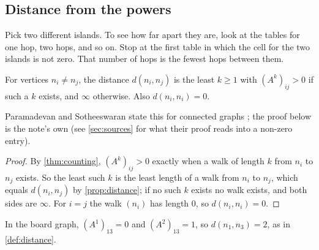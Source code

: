 \subsection{Distance from the powers}

\plainwords{} Pick two different islands. To see how far apart they are, look at
the tables for one hop, two hops, and so on. Stop at the first
table in which the cell for the two islands is not zero. That number of
hops is the fewest hops between them.

\begin{corollary}\label{cor:dist}
For vertices $n_i\ne n_j$, the distance $d(n_i,n_j)$ is the least $k\ge 1$
with $(A^k)_{ij}>0$ if such a $k$ exists, and $\infty$ otherwise. Also
$d(n_i,n_i)=0$.
\end{corollary}
Paramadevan and Sotheeswaran state this for connected graphs
\cite[Theorem~3, p.~17]{paramadevan2021adjacency}; the proof below is the
note's own (see \cref{sec:sources} for what their proof reads into a
non-zero entry).
\begin{proof}
By \cref{thm:counting}, $(A^k)_{ij}>0$ exactly when a walk of length $k$
from $n_i$ to $n_j$ exists. So the least such $k$ is the least length of a
walk from $n_i$ to $n_j$, which equals $d(n_i,n_j)$ by
\cref{prop:distance}; if no such $k$ exists no walk exists, and both sides
are $\infty$. For $i=j$ the walk $(n_i)$ has length $0$, so $d(n_i,n_i)=0$.
\end{proof}

\begin{example}
In the board graph, $(A^1)_{13}=0$ and $(A^2)_{13}=1$, so
$d(n_1,n_3)=2$, as in \cref{def:distance}.
\end{example}
